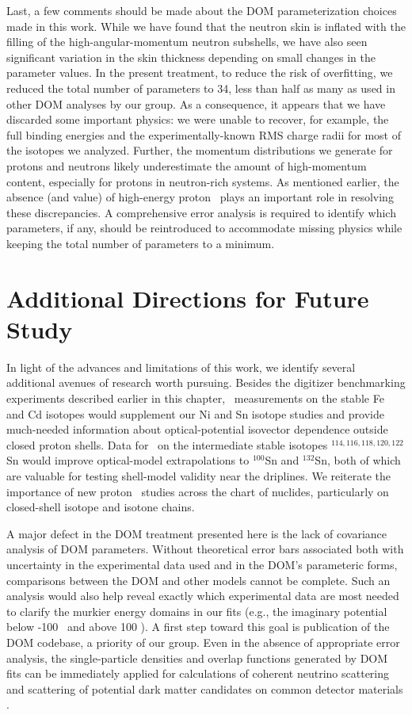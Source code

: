 Last, a few comments should be made about the DOM parameterization choices made
in this work. While we have found that the neutron
skin is inflated with the filling of the high-angular-momentum neutron subshells, we
have also seen significant variation in the skin thickness depending on small
changes in the parameter values. In the present treatment, to reduce the risk
of overfitting, we reduced
the total number of parameters to 34, less than half as many as used in
other DOM analyses by our group. As a consequence, it appears that we have
discarded some important physics: we were unable to recover, for example, the full
binding energies and the experimentally-known RMS charge radii for most of the
isotopes we analyzed. Further, the momentum distributions we generate for protons and
neutrons likely underestimate the amount of high-momentum content, especially
for protons in neutron-rich systems. As mentioned earlier, the absence (and
value) of high-energy proton \rxn\ plays an important role in resolving these
discrepancies. A comprehensive error analysis is required
to identify which parameters, if any, should be reintroduced to accommodate
missing physics while keeping the total number of parameters to a minimum.

\section{Additional Directions for Future Study}
In light of the advances and limitations of this work, we identify several
additional avenues of research worth pursuing.
Besides the digitizer benchmarking experiments described earlier
in this chapter, \tot\ measurements on the stable Fe and Cd isotopes would
supplement our Ni and Sn isotope studies and provide much-needed information
about optical-potential isovector dependence outside closed proton shells.
Data for \tot\ on the intermediate stable isotopes $^{114,116,118,120,122}$Sn
would improve optical-model extrapolations to $^{100}$Sn and $^{132}$Sn,
both of which are valuable for testing shell-model validity near the driplines.
We reiterate the importance of new proton \rxn\
studies across the chart of nuclides, particularly on closed-shell isotope and isotone
chains.

A major defect in the DOM treatment presented here is
the lack of covariance analysis of DOM parameters. Without theoretical error
bars associated both with uncertainty in the experimental data used and in the
DOM's parameteric forms, comparisons between the DOM and other models cannot be
complete. Such an analysis would also help reveal exactly which experimental
data are most needed to clarify the murkier energy domains in our fits (e.g.,
the imaginary potential below -100 \mega\electronvolt\ and above 100
\mega\electronvolt). A first step toward this goal is publication of the DOM codebase, a
priority of our group. Even in the absence of appropriate error analysis, 
the single-particle densities and overlap functions generated by DOM fits can be
immediately applied for calculations of coherent neutrino scattering \cite{Herraiz2009} and
scattering of potential dark matter candidates on common detector materials \cite{Anand2014}.

